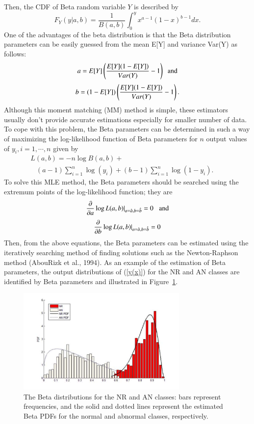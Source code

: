\documentclass[times,twocolumn,final,authoryear]{elsarticle}
\begin{document}
Then, the CDF of Beta random variable $Y$ is described by
\begin{equation}
F_Y(y|a, b) = \frac 1 {B(a, b)}\int^y_0 x^{a-1}(1-x)^{b-1}dx. \label{F_Y}
\end{equation}
One of the advantages of the beta distribution is that the Beta distribution parameters can be easily guessed from 
the mean E[Y] and variance Var(Y) as follows:
\begin{equation}
a =  E[Y]\left( {{E[Y](1-E[Y])}\over Var(Y)}-1
\right) \; \; \mbox{and}\label{p_alpha}
\end{equation}
\begin{equation}
b = (1-E[Y])\left( {{E[Y](1-E[Y])}\over Var(Y)}-1
\right).\label{p_beta}
\end{equation}
Although this moment matching (MM) method is simple, these estimators usually don't provide accurate estimations especially for smaller number of data. 
To cope with this problem, the Beta parameters can be determined in such a way of maximizing the log-likelihood function of Beta parameters for 
$n$ output values of $y_i, i=1, \cdots, n$ given by
\begin{eqnarray}
L(a, b) = -n\log B(a, b) +  \; \; \; \; \; \; \; \; \; \; \; \; & & \nonumber \\
\; \; \; (a-1)\sum_{i=1}^n\log (y_i) + (b-1)\sum_{i=1}^n\log(1-y_i). & & \label{L_beta}
\end{eqnarray}
To solve this MLE method, the Beta parameters should be searched using the extremum points of the log-likelihood function; they are
\begin{equation}
{\partial\over {\partial a}}\log L(a, b)|_{a=\hat a, b=\hat b} = 0 \; \;\;  \mbox{and}
\end{equation}
\begin{equation}
{\partial\over {\partial b}}\log L(a, b)|_{a=\hat a, b=\hat b} = 0
\end{equation}
Then, from the above equations, the Beta parameters can be estimated using the iteratively searching method of finding solutions such as 
the Newton-Raphson method (AbouRizk et al., 1994).
As an example of the estimation of Beta parameters, the output distributions of (\ref{y(x)}) for the NR and AN classes are identified by Beta parameters and illustrated in Figure~\ref{fig_CPON}.

\begin{figure}[!t]
\centering
\includegraphics[width=8.4cm]{Fig_3.pdf}
\caption{The Beta distributions for the NR and AN classes: bars represent frequencies, and the solid and dotted lines represent 
the estimated Beta PDFs for the normal and abnormal classes, respectively.}
\label{fig_CPON}
\end{figure}
\end{document}
